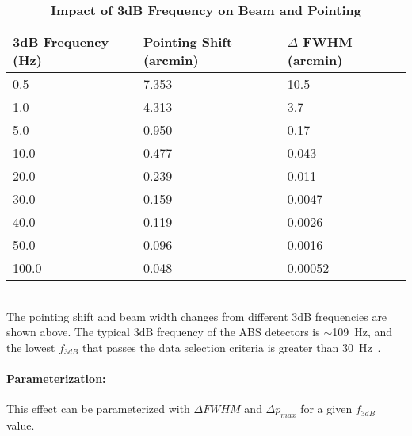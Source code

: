 \begin{table}[h!] 
\begin{center}
  \caption {\textbf{Impact of 3dB Frequency on Beam and Pointing}}\label{table:tc_shift}
\begin{tabular}{|l|l|l|}
  \hline                        
  \textbf{3dB Frequency (Hz)} &  \textbf{Pointing Shift (arcmin)} &  \textbf{$\Delta$ FWHM (arcmin)} \\
  \hline
  0.5 & 7.353 & 10.5 \\
  \hline
  1.0 & 4.313 & 3.7 \\
  \hline
  5.0 & 0.950 & 0.17 \\
 \hline  
  10.0 & 0.477 & 0.043 \\
 \hline  
  20.0 & 0.239 & 0.011 \\
 \hline  
  30.0 & 0.159 & 0.0047 \\
 \hline  
  40.0 & 0.119 & 0.0026 \\
 \hline  
  50.0 & 0.096 & 0.0016 \\
 \hline  
  100.0 & 0.048 & 0.00052 \\
 \hline  
\end{tabular}\\
The pointing shift and beam width changes from different 3dB frequencies are shown above. The typical 3dB frequency of the ABS detectors is $\sim$109~Hz, and the lowest $f_{3dB}$ that passes the data selection criteria is greater than 30~Hz~\cite{Simon_Thesis_2016}.
\end{center}
\end{table}

\paragraph{Parameterization:}
This effect can be parameterized with $\Delta FWHM$ and $\Delta p_{max}$ for a given $f_{3dB}$ value.

\clearpage
